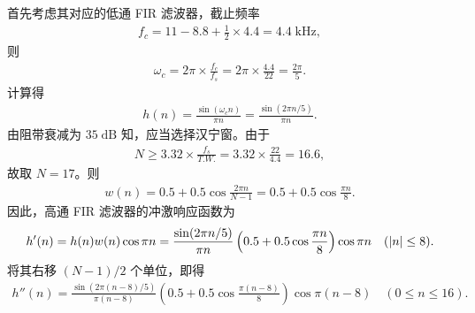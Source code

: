\begin{solution}
    首先考虑其对应的低通 FIR 滤波器，截止频率
    \begin{align*}
        f_c = 11 - 8.8 + \frac{1}{2} \times 4.4 = 4.4\;\mathrm{kHz},
    \end{align*}
    则
    \begin{align*}
        \omega_c = 2\pi \times \frac{f_c}{f_s} = 2\pi \times \frac{4.4}{22} = \frac{2\pi}{5}.
    \end{align*}
    计算得
    \begin{align*}
        h(n) = \frac{\sin(\omega_c n)}{\pi n} = \frac{\sin(2\pi n / 5)}{\pi n}.
    \end{align*}
    由阻带衰减为 $35\;\mathrm{dB}$ 知，应当选择汉宁窗。由于
    \begin{align*}
        N \ge 3.32 \times \frac{f_s}{T.W.} = 3.32 \times \frac{22}{4.4} = 16.6,
    \end{align*}
    故取 $N = 17$。则
    \begin{align*}
        w(n) = 0.5 + 0.5\cos\frac{2\pi n}{N - 1} = 0.5 + 0.5\cos\frac{\pi n}{8}.
    \end{align*}
    因此，高通 FIR 滤波器的冲激响应函数为
    \begin{align*}
        h'(n) = h(n) w(n) \cos\pi n = \frac{\sin(2\pi n / 5)}{\pi n} \left(0.5 + 0.5\cos\frac{\pi n}{8}\right) \cos\pi n \quad (\left|n\right| \le 8).
    \end{align*}
    将其右移 $(N-1)/2$ 个单位，即得
    \begin{align*}
        h''(n) = \frac{\sin(2\pi (n - 8) / 5)}{\pi (n - 8)} \left(0.5 + 0.5\cos\frac{\pi (n - 8)}{8}\right) \cos\pi (n - 8) \quad (0 \le n \le 16).
    \end{align*}
\end{solution}
